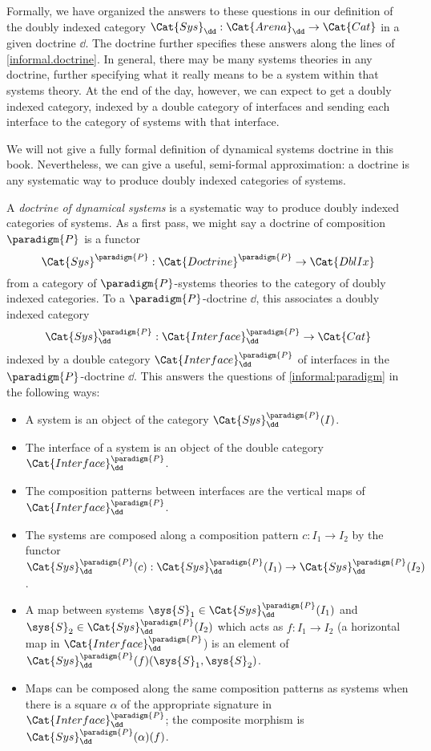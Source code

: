 \documentclass[DynamicalBook]{subfiles}
\begin{document}
Formally, we have organized the answers to these questions in our definition of the doubly indexed category $\Cat{Sys}_{\dd} : \Cat{Arena}_{{\dd}} \to \Cat{Cat}$ in a given doctrine $\dd$. The doctrine further specifies these answers along the lines of \cref{informal.doctrine}. In general, there may be many systems theories in any doctrine, further specifying what it really means to be a system within that systems theory. At the end of the day, however, we can expect to get a doubly indexed category, indexed by a double category of interfaces and sending each interface to the category of systems with that interface.

We will not give a fully formal definition of dynamical systems doctrine in this book. Nevertheless, we can give a useful, semi-formal approximation: a doctrine is any systematic way to produce doubly indexed categories of systems.
\begin{semiformal}
  A \emph{doctrine of dynamical systems} is a systematic way to produce doubly indexed categories of systems. As a first pass, we might say a doctrine of composition $\paradigm{P}$ is a functor
  $$\Cat{Sys}^{\paradigm{P}} : \Cat{Doctrine}^{\paradigm{P}} \to \Cat{DblIx}$$
  from a category of $\paradigm{P}$-systems theories to the category of doubly indexed categories. To a $\paradigm{P}$-doctrine $\dd$, this associates a doubly indexed category
  $$\Cat{Sys}^{\paradigm{P}}_{{\dd}} : \Cat{Interface}^{{\paradigm{P}}}_{{\dd}} \to \Cat{Cat}$$
  indexed by a double category $\Cat{Interface}^{{\paradigm{P}}}_{{\dd}}$ of interfaces in the $\paradigm{P}$-doctrine $\dd$. This answers the questions of \cref{informal:paradigm} in the following ways:
  \begin{itemize}
          \item A system is an object of the category $\Cat{Sys}^{\paradigm{P}}_{\dd}(I)$.
          \item The interface of a system is an object of the double category $\Cat{Interface}^{{\paradigm{P}}}_{\dd}$.
          \item The composition patterns between interfaces are the vertical maps of $\Cat{Interface}^{{\paradigm{P}}}_{\dd}$.
          \item The systems are composed along a composition pattern $c : I_{1} \to I_{2}$ by the functor $\Cat{Sys}^{{\paradigm{P}}}_{\dd}(c) : \Cat{Sys}^{{\paradigm{P}}}_{\dd}(I_{1}) \to \Cat{Sys}^{{\paradigm{P}}}_{\dd}(I_{2})$.
          \item A map between systems $\sys{S}_{1} \in \Cat{Sys}^{{\paradigm{P}}}_{\dd}(I_{1})$ and $\sys{S}_{2} \in \Cat{Sys}^{{\paradigm{P}}}_{\dd}(I_{2})$ which acts as $f : I_{1} \to I_{2}$ (a horizontal map in $\Cat{Interface}^{{\paradigm{P}}}_{{\dd}}$) is an element of $\Cat{Sys}^{{\paradigm{P}}}_{\dd}(f)(\sys{S}_{1}, \sys{S}_{2})$.
          \item Maps can be composed along the same composition patterns as systems when there is a square  $\alpha$ of the appropriate signature in $\Cat{Interface}^{{\paradigm{P}}}_{\dd}$; the composite morphism is $\Cat{Sys}^{{\paradigm{P}}}_{\dd}(\alpha)(f)$.
  \end{itemize}
  \end{semiformal}
\end{document}
